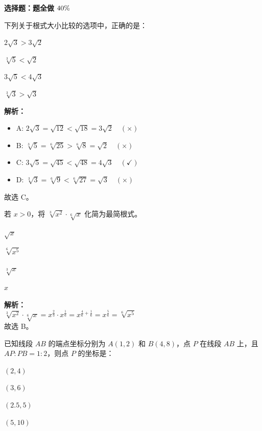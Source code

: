 \textbf{选择题：\questiontotal 题全做 \(40\%\)}

\begin{question}
    下列关于根式大小比较的选项中，正确的是： \paren[C]
    \begin{choices}
        \item $2\sqrt{3} > 3\sqrt{2}$ 
        \item $\sqrt[3]{5} < \sqrt{2}$ 
        \item $3\sqrt{5} < 4\sqrt{3}$ 
        \item $\sqrt[3]{3} > \sqrt{3}$
    \end{choices}
\end{question}

\begin{solution}
    \textbf{解析：}
    \begin{itemize}
        \item A: $2\sqrt{3} = \sqrt{12} < \sqrt{18} = 3\sqrt{2} \quad (\times)$
        \item B: $\sqrt[3]{5} = \sqrt[6]{25} > \sqrt[6]{8} = \sqrt{2} \quad (\times)$
        \item C: $3\sqrt{5} = \sqrt{45} < \sqrt{48} = 4\sqrt{3} \quad (\checkmark)$
        \item D: $\sqrt[3]{3} = \sqrt[6]{9} < \sqrt[6]{27} = \sqrt{3} \quad (\times)$
    \end{itemize}
    故选 C。
\end{solution}

\begin{question}
    若 $x > 0$，将 $\sqrt[3]{x^2} \cdot \sqrt[6]{x}$ 化简为最简根式。 \paren[B]
    \begin{choices}
        \item $\sqrt{x}$ \item $\sqrt[6]{x^5}$ \item $\sqrt[3]{x}$ \item $x$
    \end{choices}
\end{question}

\begin{solution}
    \textbf{解析：} \\
    $\sqrt[3]{x^2} \cdot \sqrt[6]{x} = x^{\frac{2}{3}} \cdot x^{\frac{1}{6}} = x^{\frac{4}{6} + \frac{1}{6}} = x^{\frac{5}{6}} = \sqrt[6]{x^5}$ \\
    故选 B。
\end{solution}

\begin{question}
    已知线段 $AB$ 的端点坐标分别为 $A(1, 2)$ 和 $B(4, 8)$，点 $P$ 在线段 $AB$ 上，且 $AP:PB = 1:2$，则点 $P$ 的坐标是： \paren[A]
    \begin{choices}
        \item $(2, 4)$ \item $(3, 6)$ \item $(2.5, 5)$ \item $(5, 10)$
    \end{choices}
\end{question}

